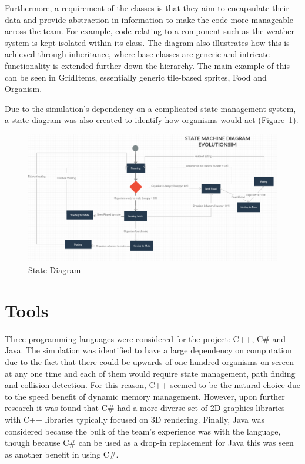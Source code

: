 \documentclass[a4paper, oneside, 11pt]{report}
\begin{document}
Furthermore, a requirement of the classes is that they aim to encapsulate their data and provide abstraction in information to make the code more manageable across the team. For example, code relating to a component such as the weather system is kept isolated within its class. The diagram also illustrates how this is achieved through inheritance, where base classes are generic and intricate functionality is extended further down the hierarchy. The main example of this can be seen in GridItems, essentially generic tile-based sprites, Food and Organism.

Due to the simulation's dependency on a complicated state management system, a state diagram was also created to identify how organisms would act (Figure~\ref{state-diagram}).

\begin{figure}[H]
	\caption{State Diagram}\label{state-diagram}
	\centering
	\includegraphics[width=1\textwidth]{state-diagram}
\end{figure}

\section{Tools}\label{tools}
Three programming languages were considered for the project: C++, C\# and Java. The simulation was identified to have a large dependency on computation due to the fact that there could be upwards of one hundred organisms on screen at any one time and each of them would require state management, path finding and collision detection. For this reason, C++ seemed to be the natural choice due to the speed benefit of dynamic memory management. However, upon further research it was found that C\# had a more diverse set of 2D graphics libraries with C++ libraries typically focused on 3D rendering. Finally, Java was considered because the bulk of the team's experience was with the language, though because C\# can be used as a drop-in replacement for Java this was seen as another benefit in using C\#.
\end{document}
